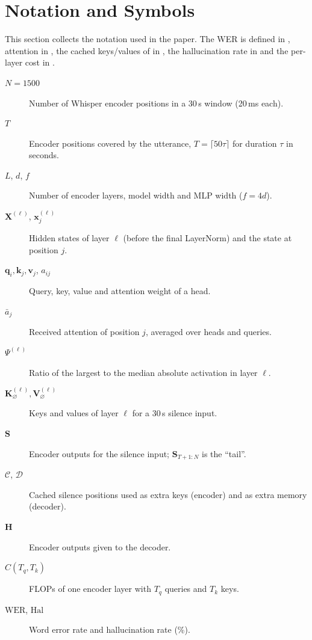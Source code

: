 \clearpage
\onecolumngrid
\appendix

\section{Notation and Symbols}
\label{app:notation}

This section collects the notation used in the paper. The WER is defined in , attention in , the cached keys/values of \method{} in , the hallucination rate in  and the per-layer cost in .

\begin{small}
\begin{description}
    \item[$N=1500$] Number of Whisper encoder positions in a 30\,s window (20\,ms each).
    \item[$T$] Encoder positions covered by the utterance, $T=\lceil 50\tau\rceil$ for duration $\tau$ in seconds.
    \item[$L$, $d$, $f$] Number of encoder layers, model width and MLP width ($f=4d$).
    \item[$\mathbf{X}^{(\ell)}$, $\mathbf{x}^{(\ell)}_j$] Hidden states of layer $\ell$ (before the final LayerNorm) and the state at position $j$.
    \item[$\mathbf{q}_i,\mathbf{k}_j,\mathbf{v}_j$, $a_{ij}$] Query, key, value and attention weight of a head.
    \item[$\bar a_j$] Received attention of position $j$, averaged over heads and queries.
    \item[$\Psi^{(\ell)}$] Ratio of the largest to the median absolute activation in layer $\ell$.
    \item[$\mathbf{K}^{(\ell)}_{\varnothing},\mathbf{V}^{(\ell)}_{\varnothing}$] Keys and values of layer $\ell$ for a 30\,s silence input.
    \item[$\mathbf{S}$] Encoder outputs for the silence input; $\mathbf{S}_{T+1:N}$ is the ``tail''.
    \item[$\mathcal{C}$, $\mathcal{D}$] Cached silence positions used as extra keys (encoder) and as extra memory (decoder).
    \item[$\mathbf{H}$] Encoder outputs given to the decoder.
    \item[$C(T_q,T_k)$] FLOPs of one encoder layer with $T_q$ queries and $T_k$ keys.
    \item[$\mathrm{WER}$, $\mathrm{Hal}$] Word error rate and hallucination rate (\%).
\end{description}
\end{small}

